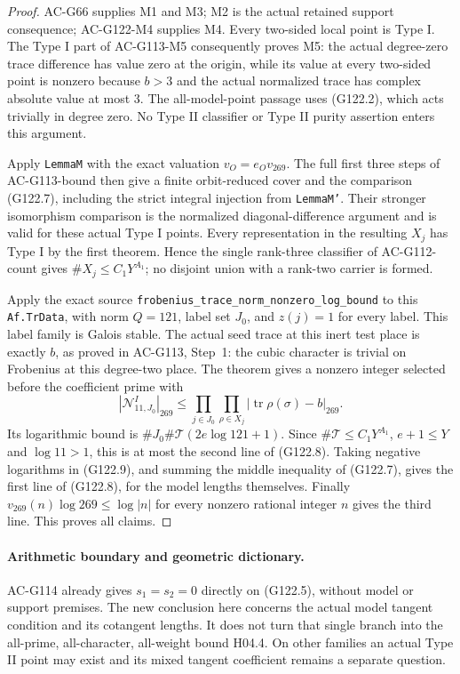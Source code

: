 \begin{proof}
AC-G66 supplies M1 and M3; M2 is the actual retained support
consequence; AC-G122-M4 supplies M4.  Every two-sided local point
is Type I.  The Type I part of AC-G113-M5 consequently proves M5:
the actual degree-zero trace difference has value zero at the
origin, while its value at every two-sided point is nonzero
because $b>3$ and the actual normalized trace has complex absolute
value at most $3$.  The all-model-point passage uses (G122.2),
which acts trivially in degree zero.  No Type II classifier or
Type II purity assertion enters this argument.

Apply \texttt{LemmaM} with the exact valuation $v_O=e_Ov_{269}$.
The full first three steps of AC-G113-bound then give a finite
orbit-reduced cover and the comparison (G122.7), including the
strict integral injection from \texttt{LemmaM'}.  Their stronger
isomorphism comparison is the normalized diagonal-difference
argument and is valid for these actual Type I points.  Every
representation in the resulting $X_j$ has Type I by the first
theorem.  Hence the single rank-three classifier of AC-G112-count
gives $\#X_j\le C_1Y^{A_1}$; no disjoint union with a rank-two
carrier is formed.

Apply the exact source
\texttt{frobenius\_trace\_norm\_nonzero\_log\_bound} to this
\texttt{Af.TrData}, with norm $Q=121$, label set $J_0$, and
$z(j)=1$ for every label.  This label family is Galois stable.
The actual seed trace at this inert test place is exactly $b$,
as proved in AC-G113, Step~1: the cubic character is trivial
on Frobenius at this degree-two place.  The theorem gives a
nonzero integer selected before the coefficient prime with
\[
 |\mathcal N^I_{11,J_0}|_{269}
   \le\prod_{j\in J_0}\prod_{\rho\in X_j}
                  |\operatorname{tr}\rho(\sigma)-b|_{269}.
                                                        \tag{G122.9}
\]
Its logarithmic bound is
$\#J_0\#\mathcal T(2e\log121+1)$.
Since $\#\mathcal T\le C_1Y^{A_1}$, $e+1\le Y$ and
$\log11>1$, this is at most the second line of (G122.8).
Taking negative logarithms in (G122.9), and summing the middle
inequality of (G122.7), gives the first line of (G122.8), for
the model lengths themselves.  Finally
$v_{269}(n)\log269\le\log|n|$ for every nonzero rational integer
$n$ gives the third line.  This proves all claims.
\end{proof}

\paragraph{Arithmetic boundary and geometric dictionary.}
AC-G114 already gives $s_1=s_2=0$ directly on (G122.5), without
model or support premises.  The new conclusion here concerns the
actual model tangent condition and its cotangent lengths.  It
does not turn that single branch into the all-prime, all-character,
all-weight bound H04.4.  On other families an actual Type II
point may exist and its mixed tangent coefficient remains a
separate question.

